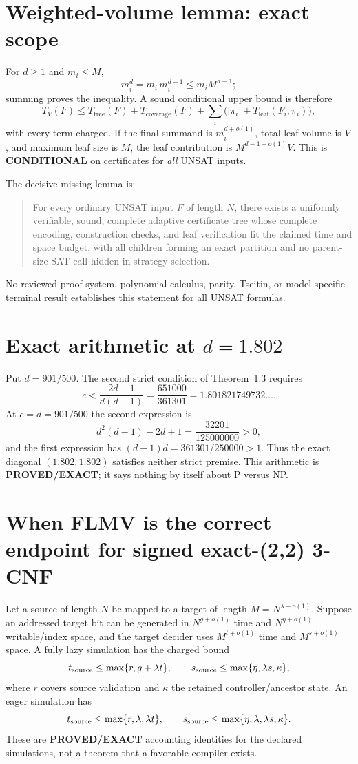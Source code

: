 \documentclass[11pt]{article}
\newcommand{\proved}{\textbf{PROVED/EXACT}}
\newcommand{\cond}{\textbf{CONDITIONAL}}
\begin{document}
\section*{Weighted-volume lemma: exact scope}
For $d\ge1$ and $m_i\le M$,
\[
m_i^d=m_i\,m_i^{d-1}\le m_i M^{d-1};
\]
summing proves the inequality.  A sound conditional upper bound is therefore
\[
T_V(F)\le T_{\mathrm{tree}}(F)+T_{\mathrm{coverage}}(F)
+\sum_i\bigl(|\pi_i|+T_{\mathrm{leaf}}(F_i,\pi_i)\bigr),
\]
with every term charged.  If the final summand is $m_i^{d+o(1)}$, total leaf volume is
$V$, and maximum leaf size is $M$, the leaf contribution is
$M^{d-1+o(1)}V$.  This is \cond{} on certificates for \emph{all} UNSAT inputs.

The decisive missing lemma is:
\begin{quote}
For every ordinary UNSAT input $F$ of length $N$, there exists a uniformly verifiable,
sound, complete adaptive certificate tree whose complete encoding, construction checks,
and leaf verification fit the claimed time and space budget, with all children forming
an exact partition and no parent-size SAT call hidden in strategy selection.
\end{quote}
No reviewed proof-system, polynomial-calculus, parity, Tseitin, or model-specific
terminal result establishes this statement for all UNSAT formulas.

\section*{Exact arithmetic at $d=1.802$}
Put $d=901/500$.  The second strict condition of Theorem~1.3 requires
\[
c<\frac{2d-1}{d(d-1)}=\frac{651000}{361301}
=1.801821749732\ldots .
\]
At $c=d=901/500$ the second expression is
\[
d^2(d-1)-2d+1=\frac{32201}{125000000}>0,
\]
and the first expression has $(d-1)d=361301/250000>1$.  Thus the exact
diagonal $(1.802,1.802)$ satisfies neither strict premise.  This arithmetic is
\proved{}; it says nothing by itself about P versus NP.

\section*{When FLMV is the correct endpoint for signed exact-(2,2) 3-CNF}
Let a source of length $N$ be mapped to a target of length
$M=N^{\lambda+o(1)}$.  Suppose an addressed target bit can be generated in
$N^{g+o(1)}$ time and $N^{\eta+o(1)}$ writable/index space, and the target decider uses
$M^{t+o(1)}$ time and $M^{s+o(1)}$ space.  A fully lazy simulation has the charged
bound
\[
t_{\rm source}\le\max\{r,g+\lambda t\},\qquad
s_{\rm source}\le\max\{\eta,\lambda s,\kappa\},
\]
where $r$ covers source validation and $\kappa$ the retained controller/ancestor state.
An eager simulation has
\[
t_{\rm source}\le\max\{r,\lambda,\lambda t\},\qquad
s_{\rm source}\le\max\{\eta,\lambda,\lambda s,\kappa\}.
\]
These are \proved{} accounting identities for the declared simulations, not a theorem
that a favorable compiler exists.
\end{document}
